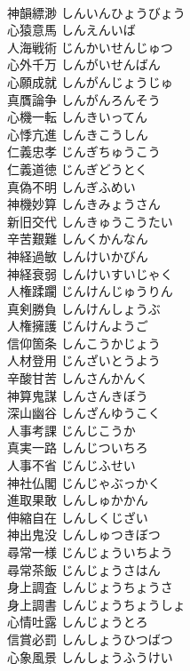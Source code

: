 \documentclass[8pt]{extreport}
\begin{document}
\begin{CJK}{UTF8}{min}
\\	神韻縹渺	しんいんひょうびょう	
\\	心猿意馬	しんえんいば	
\\	人海戦術	じんかいせんじゅつ	
\\	心外千万	しんがいせんばん	
\\	心願成就	しんがんじょうじゅ	
\\	真贋論争	しんがんろんそう	
\\	心機一転	しんきいってん	
\\	心悸亢進	しんきこうしん	
\\	仁義忠孝	じんぎちゅうこう	
\\	仁義道徳	じんぎどうとく	
\\	真偽不明	しんぎふめい	
\\	神機妙算	しんきみょうさん	
\\	新旧交代	しんきゅうこうたい	
\\	辛苦艱難	しんくかんなん	
\\	神経過敏	しんけいかびん	
\\	神経衰弱	しんけいすいじゃく	
\\	人権蹂躙	じんけんじゅうりん	
\\	真剣勝負	しんけんしょうぶ	
\\	人権擁護	じんけんようご	
\\	信仰箇条	しんこうかじょう	
\\	人材登用	じんざいとうよう	
\\	辛酸甘苦	しんさんかんく	
\\	神算鬼謀	しんさんきぼう	
\\	深山幽谷	しんざんゆうこく	
\\	人事考課	じんじこうか	
\\	真実一路	しんじついちろ	
\\	人事不省	じんじふせい	
\\	神社仏閣	じんじゃぶっかく	
\\	進取果敢	しんしゅかかん	
\\	伸縮自在	しんしくじざい	
\\	神出鬼没	しんしゅつきぼつ	
\\	尋常一様	じんじょういちよう	
\\	尋常茶飯	じんじょうさはん	
\\	身上調査	しんじょうちょうさ	
\\	身上調書	しんじょうちょうしょ	
\\	心情吐露	しんじょうとろ	
\\	信賞必罰	しんしょうひつばつ	
\\	心象風景	しんしょうふうけい	

\end{CJK}
\end{document}
